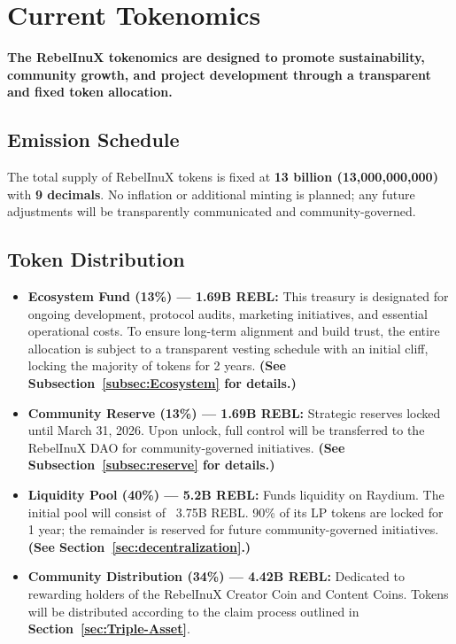 \documentclass{article}
\begin{document}
\section[
  \texorpdfstring{\color{primaryColor}Current Tokenomics}{Current Tokenomics}
]{\color{primaryColor}\textbf{Current Tokenomics}}
\begin{tcolorbox}[colback=headerColor!10!white, colframe=headerColor, boxrule=2pt, width=\textwidth, arc=6mm, left=8mm, right=8mm, top=6mm, bottom=6mm]
\textbf{The RebelInuX tokenomics are designed to promote sustainability, community growth, and project development through a transparent and fixed token allocation.}

\subsection[
  \texorpdfstring{\color{primaryColor}Emission Schedule}{Emission Schedule}
]{\color{primaryColor}Emission Schedule}

The total supply of RebelInuX tokens is fixed at \textbf{13 billion (13,000,000,000)} with \textbf{9 decimals}. No inflation or additional minting is planned; any future adjustments will be transparently communicated and community-governed.

\subsection[
  \texorpdfstring{\color{primaryColor}Token Distribution}{Token Distribution}
]{\color{primaryColor}Token Distribution}

\begin{itemize}
    \item \textbf{Ecosystem Fund (13\%) — 1.69B REBL:} This treasury is designated for ongoing development, protocol audits, marketing initiatives, and essential operational costs. To ensure long-term alignment and build trust, the entire allocation is subject to a transparent vesting schedule with an initial cliff, locking the majority of tokens for 2 years. \textbf{(See Subsection~\ref{subsec:Ecosystem} for details.)}
  \item \textbf{Community Reserve (13\%) — 1.69B REBL:}
    Strategic reserves locked until March 31, 2026. Upon unlock, full control will be transferred to the RebelInuX DAO for community-governed initiatives.
\textbf{(See Subsection~\ref{subsec:reserve} for details.)}
  \item \textbf{Liquidity Pool (40\%) — 5.2B REBL:}
    Funds liquidity on Raydium. The initial pool will consist of ~3.75B REBL. 90\% of its LP tokens are locked for 1 year; the remainder is reserved for future community-governed initiatives. \textbf{(See Section~\ref{sec:decentralization}.)}
  \item \textbf{Community Distribution (34\%) — 4.42B REBL:}
    Dedicated to rewarding holders of the RebelInuX Creator Coin and Content Coins. Tokens will be distributed according to the claim process outlined in \textbf{Section~\ref{sec:Triple-Asset}}.
\end{itemize}


\end{tcolorbox}
\end{document}
